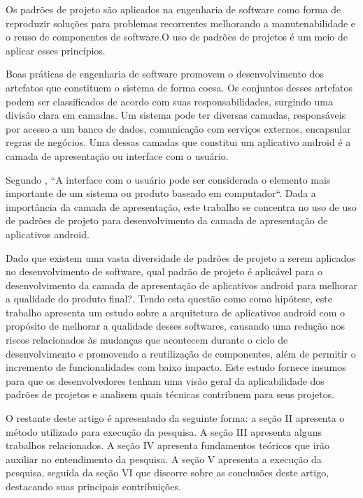 \documentclass[conference]{IEEEtran}
\begin{document}
Os padrões de projeto são aplicados na engenharia de software como forma de
reproduzir  soluções  para problemas recorrentes melhorando a manutenabilidade e
o reuso de componentes de software\cite{gof}.O uso de padrões de projetos
é um meio de aplicar esses princípios.

Boas práticas de engenharia de software promovem o desenvolvimento dos
artefatos que constituem o sistema de forma coesa. Os conjuntos desses artefatos
podem ser classificados de acordo com suas responsabilidades, surgindo
uma divisão clara em camadas. Um sistema pode ter diversas camadas, responsáveis
por acesso a um banco de dados, comunicação com serviços externos, encapsular
regras de negócios. Uma dessas camadas que constitui um aplicativo android é a
camada de apresentação ou interface com o usuário.
 
Segundo \cite{pressman}, ``A interface com o usuário pode ser considerada
o elemento mais importante de um sistema ou produto baseado em computador``.
Dada a importância da camada de apresentação, este trabalho se concentra no uso
de uso de padrões de projeto para desenvolvimento da camada de apresentação de aplicativos android.

Dado que existem uma vasta diversidade de padrões de projeto a serem aplicados
no desenvolvimento de software, qual padrão de projeto é aplicável para o
desenvolvimento da camada de apresentação de aplicativos android para melhorar a
qualidade do produto final?. Tendo esta questão como como hipótese, este
trabalho apresenta um estudo sobre a arquitetura de aplicativos android com o
propósito de melhorar a qualidade desses softwares, causando uma redução nos
riscos relacionados às mudanças que acontecem durante o ciclo de desenvolvimento
e promovendo a reutilização de componentes, além de permitir o incremento de
funcionalidades com baixo impacto. Este estudo fornece insumos para que os
desenvolvedores tenham uma visão geral da aplicabilidade dos padrões de projetos
e analisem quais técnicas contribuem para seus projetos.

O restante deste artigo é apresentado da seguinte forma: a seção II apresenta o
método utilizado para execução da pesquisa. A seção III apresenta alguns
trabalhos relacionados. A seção IV apresenta fundamentos teóricos que irão
auxiliar no entendimento da pesquisa. A seção V apresenta a execução da
pesquisa, seguida da seção VI que discorre sobre as conclusões deste artigo,
destacando suas principais contribuições.
\end{document}
